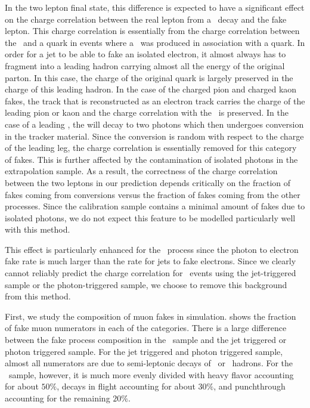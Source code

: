 \documentclass{cmspaper}
\begin{document}
In the two lepton final state, this difference is expected to have a significant effect on the charge correlation between the real lepton from a \WPM\ decay and the fake lepton. This charge correlation is essentially from the charge correlation between the \WPM\ and a quark in events where a \WPM\ was produced in association with a quark. In order for a jet to be able to fake an isolated electron, it almost always has to fragment into a leading hadron carrying almost all the energy of the original parton. In this case, the charge of the original quark is largely preserved in the charge of this leading hadron. In the case of the charged pion and charged kaon fakes, the track that is reconstructed as an electron track carries the charge of the leading pion or kaon and the charge correlation with the \WPM\ is preserved. In the case of a leading \pizero, the \pizero will decay to two photons which then undergoes conversion in the tracker material. Since the conversion is random with respect to the charge of the leading leg, the charge correlation is essentially removed for this category of fakes. This is further affected by the contamination of isolated photons in the extrapolation sample. As a result, the correctness of the charge correlation between the two leptons in our prediction depends critically on the fraction of fakes coming from conversions versus the fraction of fakes coming from the other processes. Since the calibration sample contains a minimal amount of fakes due to isolated photons, we do not expect this feature to be modelled particularly well with this method. 

This effect is particularly enhanced for the \WPlusGamma\ process since the photon to electron fake rate is much larger than the rate for jets to fake electrons.  Since we clearly cannot reliably predict the charge correlation for \WPlusGamma\ events using the jet-triggered sample or the photon-triggered sample, 
we choose to remove this background from this method.

First, we study the composition of muon fakes in simulation.  shows the fraction of fake muon numerators in each of the categories. There is a large difference between the fake process composition in the \WPlusJets\ sample and the jet triggered or photon triggered sample. For the jet triggered and photon triggered sample, almost all numerators are due to semi-leptonic decays of \B\ or \D\ hadrons. For the \WPlusJets\ sample, however, it is much more evenly divided with heavy flavor accounting for about $50\%$, decays in flight accounting for about $30\%$, and punchthrough accounting for the remaining $20\%$. 
\end{document}
